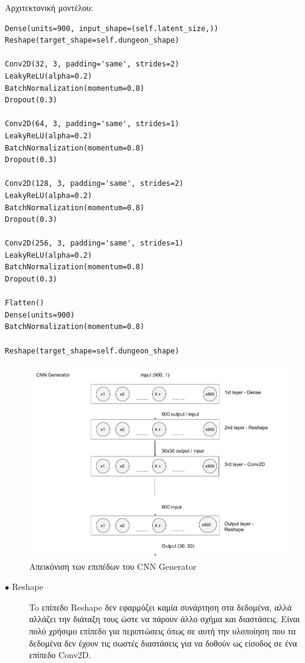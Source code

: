 Αρχιτεκτονική μοντέλου:
\begin{verbatim}
Dense(units=900, input_shape=(self.latent_size,))
Reshape(target_shape=self.dungeon_shape)

Conv2D(32, 3, padding='same', strides=2)
LeakyReLU(alpha=0.2)
BatchNormalization(momentum=0.8)
Dropout(0.3)

Conv2D(64, 3, padding='same', strides=1)
LeakyReLU(alpha=0.2)
BatchNormalization(momentum=0.8)
Dropout(0.3)

Conv2D(128, 3, padding='same', strides=2)
LeakyReLU(alpha=0.2)
BatchNormalization(momentum=0.8)
Dropout(0.3)

Conv2D(256, 3, padding='same', strides=1)
LeakyReLU(alpha=0.2)
BatchNormalization(momentum=0.8)
Dropout(0.3)

Flatten()
Dense(units=900)
BatchNormalization(momentum=0.8)

Reshape(target_shape=self.dungeon_shape)
\end{verbatim}

\begin{figure}[H]
\centering
\includegraphics[width=.8\linewidth]{../images/graphs/CNN_generator.png}
\caption{Απεικόνιση των επιπέδων του CNN Generator}
\label{fig:fig}
\end{figure}

\begin{description}
\item[$\bullet$ Reshape] To επίπεδο Reshape δεν εφαρμόζει καμία συνάρτηση στα δεδομένα, αλλά αλλάζει την διάταξη τους ώστε να πάρουν άλλο σχήμα και διαστάσεις. Είναι πολύ χρήσιμο επίπεδο για περιπτώσεις όπως σε αυτή την υλοποίηση που τα δεδομένα δεν έχουν τις σωστές διαστάσεις για να δοθούν ως είσοδος σε ένα επίπεδο Conv2D.
\end{description}

